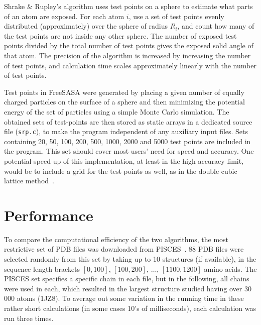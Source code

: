 \documentclass[a4paper,11pt]{article}
\begin{document}
Shrake \& Rupley's algorithm uses test points on a sphere to estimate
what parts of an atom are exposed. For each atom $i$, use a set of
test points evenly distributed (approximately) over the sphere of
radius $R_i$, and count how many of the test points are not inside any
other sphere. The number of exposed test points divided by the total
number of test points gives the exposed solid angle of that atom. The
precision of the algorithm is increased by increasing the number of
test points, and calculation time scales approximately linearly with
the number of test points.

Test points in FreeSASA were generated by placing a given number of
equally charged particles on the surface of a sphere and then
minimizing the potential energy of the set of particles using a simple
Monte Carlo simulation. The obtained sets of test-points are then
stored as static arrays in a dedicated source file (\texttt{srp.c}),
to make the program independent of any auxiliary input files. Sets
containing 20, 50, 100, 200, 500, 1000, 2000 and 5000 test points are
included in the program. This set should cover most users' need for
speed and accuracy. One potential speed-up of this implementation, at
least in the high accuracy limit, would be to include a grid for the
test points as well, as in the double cubic lattice
method~\cite{DCLM}.
 
\section{Performance}\label{sec:performance}

To compare the computational efficiency of the two algorithms, the
most restrictive set of PDB files was downloaded from
PISCES~\cite{PISCES}.  88 PDB files were selected randomly from this
set by taking up to 10 structures (if available), in the sequence
length brackets $[0,100]$, $[100,200]$, $\dots$, $[1100,1200]$ amino
acids. The PISCES set specifies a specific chain in each file, but in
the following, all chains were used in each, which resulted in the
largest structure studied having over 30\,000 atoms (1JZ8). To average
out some variation in the running time in these rather short
calculations (in some cases 10's of milliseconds), each calculation was
run three times.
\end{document}
